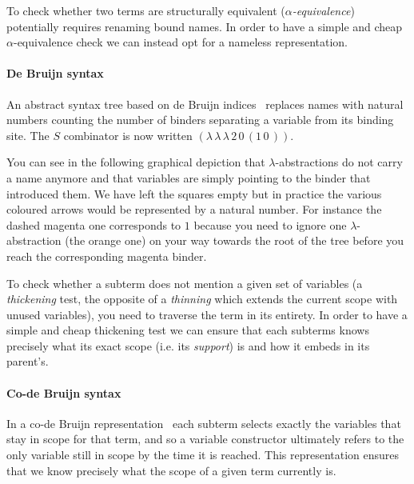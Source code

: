 
To check whether two terms are structurally equivalent (\emph{$\alpha$-equivalence})
potentially requires renaming bound names.
%
In order to have a simple and cheap $\alpha$-equivalence check we can instead opt
for a nameless representation.

\paragraph{De Bruijn syntax}
An abstract syntax tree based on de Bruijn indices~\cite{MANUAL:journals/math/debruijn72}
replaces names with natural numbers counting the number of binders separating a variable
from its binding site.
%
The $S$ combinator is now written $(\lambda\, \lambda\, \lambda\, 2\, 0\, (1\, 0\,))$.

You can see in the following graphical depiction that
$\lambda$-abstractions do not carry a name anymore and that variables are simply pointing
to the binder that introduced them. We have left the squares empty but in practice
the various coloured arrows would be represented by a natural number.
%
For instance the {\color{magenta}dashed magenta} one corresponds to $1$
because you need to ignore one $\lambda{}$-abstraction
(the {\color{orange}orange} one) on your way towards the root of the tree
before you reach the corresponding magenta binder.


To check whether a subterm does not mention a given set of variables
(a \emph{thickening} test, the opposite of a \emph{thinning} which extends the
current scope with unused variables), you need to traverse the term in its entirety.
%
In order to have a simple and cheap thickening test we can ensure that each subterms
knows precisely what its exact scope (i.e. its \emph{support}) is and how it embeds
in its parent's.

\paragraph{Co-de Bruijn syntax}
In a co-de Bruijn
representation~\cite{DBLP:journals/corr/abs-1807-04085} each subterm
selects exactly the variables that stay in scope for that term,
and so a variable constructor ultimately refers to the only variable still
in scope by the time it is reached.
%
This representation ensures that we know precisely what the scope of a given term
currently is.

